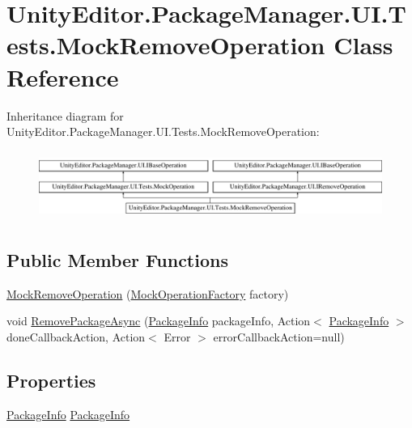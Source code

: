 \hypertarget{class_unity_editor_1_1_package_manager_1_1_u_i_1_1_tests_1_1_mock_remove_operation}{}\section{Unity\+Editor.\+Package\+Manager.\+U\+I.\+Tests.\+Mock\+Remove\+Operation Class Reference}
\label{class_unity_editor_1_1_package_manager_1_1_u_i_1_1_tests_1_1_mock_remove_operation}
Inheritance diagram for Unity\+Editor.\+Package\+Manager.\+U\+I.\+Tests.\+Mock\+Remove\+Operation\+:\begin{figure}[H]
\begin{center}
\leavevmode
\includegraphics[height=2.276423cm]{class_unity_editor_1_1_package_manager_1_1_u_i_1_1_tests_1_1_mock_remove_operation}
\end{center}
\end{figure}
\subsection*{Public Member Functions}
\begin{DoxyCompactItemize}
\item 
\mbox{\hyperlink{class_unity_editor_1_1_package_manager_1_1_u_i_1_1_tests_1_1_mock_remove_operation_a2e3a6f7f91c00c2820813ea1dc426718}{Mock\+Remove\+Operation}} (\mbox{\hyperlink{class_unity_editor_1_1_package_manager_1_1_u_i_1_1_tests_1_1_mock_operation_factory}{Mock\+Operation\+Factory}} factory)
\item 
void \mbox{\hyperlink{class_unity_editor_1_1_package_manager_1_1_u_i_1_1_tests_1_1_mock_remove_operation_a6eb0a7297483a1f4a62cbbc890f0b843}{Remove\+Package\+Async}} (\mbox{\hyperlink{class_unity_editor_1_1_package_manager_1_1_u_i_1_1_package_info}{Package\+Info}} package\+Info, Action$<$ \mbox{\hyperlink{class_unity_editor_1_1_package_manager_1_1_u_i_1_1_package_info}{Package\+Info}} $>$ done\+Callback\+Action, Action$<$ Error $>$ error\+Callback\+Action=null)
\end{DoxyCompactItemize}
\subsection*{Properties}
\begin{DoxyCompactItemize}
\item 
\mbox{\hyperlink{class_unity_editor_1_1_package_manager_1_1_u_i_1_1_package_info}{Package\+Info}} \mbox{\hyperlink{class_unity_editor_1_1_package_manager_1_1_u_i_1_1_tests_1_1_mock_remove_operation_af67f49d662205ef776d9ecfa598705d2}{Package\+Info}}
\end{DoxyCompactItemize}
